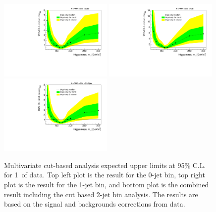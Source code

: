 \begin{figure}[!htbp]
\begin{center}
   \includegraphics[width=0.49\textwidth]{figures/limits_0j_1000pb_datalike_mva_1.pdf}
   \includegraphics[width=0.49\textwidth]{figures/limits_1j_1000pb_datalike_mva_1.pdf}
   \includegraphics[width=0.49\textwidth]{figures/limits_nj_1000pb_datalike_mva_1.pdf}
   \caption{Multivariate cut-based analysis expected upper limits at 95\% C.L. for 1\ifb\ of data. Top left plot 
   is the result for the 0-jet bin, top right plot is the result for the 1-jet bin, and 
   bottom plot is the combined result including the cut based 2-jet bin analysis. The results 
   are based on the signal and backgrounds corrections from data.}
   \label{fig:mvabase_uls_datalike}
\end{center}
\end{figure}

